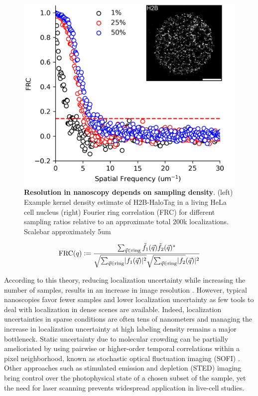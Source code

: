 \begin{figure}[t]
\begin{center}
\includegraphics[width=14cm]{media/FRC.png}
\end{center}
\caption{\textbf{Resolution in nanoscopy depends on sampling density}. (left) Example kernel density estimate of H2B-HaloTag in a living HeLa cell nucleus (right) Fourier ring correlation (FRC) for different sampling ratios relative to an approximate total 200k localizations. Scalebar approximately 5um}
\label{fig:fig3}
\end{figure}

\begin{equation}
\mathrm{FRC}(q) \vcentcolon = \frac{\sum_{\vec{q}\in\mathrm{ring}}\tilde{f_{1}}(\vec{q})\tilde{f_{2}}(\vec{q})^{*}}{\sqrt{\sum_{\vec{q}\in\mathrm{ring}}\lvert f_{1}(\vec{q})\lvert^{2}}\sqrt{\sum_{\vec{q}\in\mathrm{ring}}\lvert f_{2}}(\vec{q})\lvert^{2}}
\end{equation}

According to this theory, reducing localization uncertainty while increasing the number of samples, results in an increase in image resolution \parencite{Nieuwenhuizen2013}. However, typical nanoscopies favor fewer samples and lower localization uncertainty as few tools to deal with localization in dense scenes are available. Indeed, localization uncertainties in sparse conditions are often tens of nanometers and managing the increase in localization uncertainty at high labeling density remains a major bottleneck. Static uncertainty due to molecular crowding can be partially amelioriated by using pairwise or higher-order temporal correlations within a pixel neighborhood, known as stochastic optical fluctuation imaging (SOFI) \parencite{Dertinger2009}. Other approaches such as stimulated emission and depletion (STED) imaging bring control over the photophysical state of a chosen subset of the sample, yet the need for laser scanning prevents widespread application in live-cell studies. 

